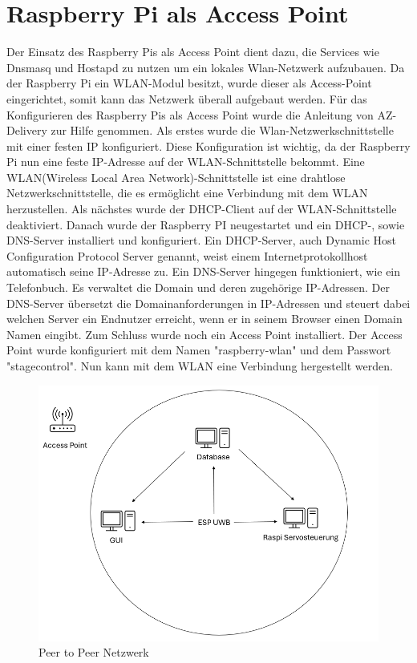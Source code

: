 \section{Raspberry Pi als Access Point} \label{RaspberryAccessPoint}
Der Einsatz des Raspberry Pis als Access Point dient dazu, die Services wie Dnsmasq und Hostapd zu nutzen um ein lokales Wlan-Netzwerk aufzubauen. Da der Raspberry Pi ein WLAN-Modul besitzt, wurde dieser als Access-Point eingerichtet, somit kann das Netzwerk überall aufgebaut werden.  
Für das Konfigurieren des Raspberry Pis als Access Point wurde die Anleitung von AZ-Delivery zur Hilfe genommen. Als erstes wurde die Wlan-Netzwerkschnittstelle mit einer festen IP konfiguriert. Diese Konfiguration ist wichtig, da der Raspberry Pi nun eine feste IP-Adresse auf der WLAN-Schnittstelle bekommt. Eine WLAN(Wireless Local Area Network)-Schnittstelle ist eine drahtlose Netzwerkschnittstelle, die es ermöglicht eine Verbindung mit dem WLAN herzustellen. Als nächstes wurde der DHCP-Client auf der WLAN-Schnittstelle deaktiviert. Danach wurde der Raspberry PI neugestartet und ein DHCP-, sowie DNS-Server installiert und konfiguriert. Ein DHCP-Server, auch Dynamic Host Configuration Protocol Server genannt, weist einem Internetprotokollhost automatisch seine IP-Adresse zu. Ein DNS-Server hingegen funktioniert, wie ein Telefonbuch. Es verwaltet die Domain und deren zugehörige IP-Adressen. Der DNS-Server übersetzt die Domainanforderungen in IP-Adressen und steuert dabei welchen Server ein Endnutzer erreicht, wenn er in seinem Browser einen Domain Namen eingibt.  Zum Schluss wurde noch ein Access Point installiert. Der Access Point wurde konfiguriert mit dem Namen "raspberry-wlan" und dem Passwort "stagecontrol". Nun kann mit dem WLAN eine Verbindung hergestellt werden. \parencite{RaspberryPiAccessPoint}

\begin{figure}[H]
	\centering
	\includegraphics[width=0.5\linewidth]{images/Peer to Peer Netzwerk.png}
	\caption[Peer to Peer Netzwerk]{Peer to Peer Netzwerk}
	\label{fig:Peer to Peer Netzwerk} 
\end{figure}

